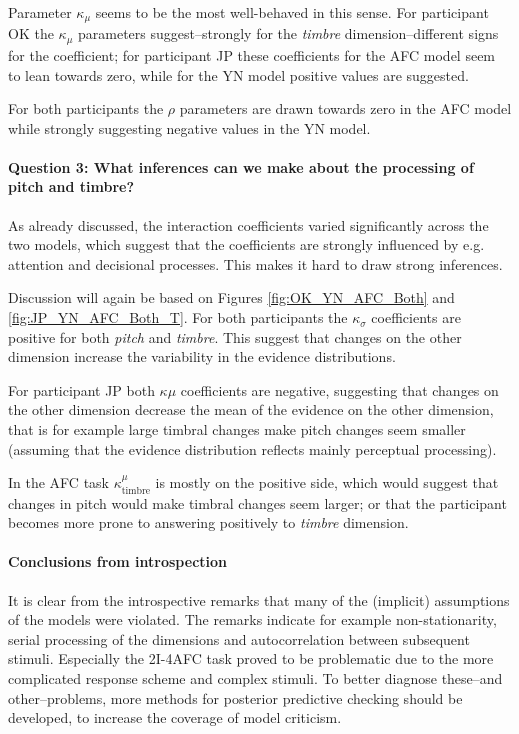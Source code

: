 \documentclass{article}\usepackage{knitr}
\begin{document}
Parameter $\kappa_{\mu}$ seems to be the most well-behaved  in this sense. For participant OK the $\kappa_{\mu}$ parameters suggest--strongly for the \textit{timbre} dimension--different signs for the coefficient; for participant JP these coefficients for the AFC model seem to lean towards zero, while for the YN model positive values are suggested. 

For both participants the $\rho$ parameters are drawn towards zero in the AFC model while strongly suggesting negative values in the YN model. 

\paragraph{Question 3: What inferences can we make about the processing of pitch and timbre?}

As already discussed, the interaction coefficients varied significantly across the two models, which suggest that the coefficients are strongly influenced by e.g. attention and decisional processes. This makes it hard to draw strong inferences.

Discussion will again be based on Figures \ref{fig:OK_YN_AFC_Both} and \ref{fig:JP_YN_AFC_Both_T}. For both participants the $\kappa_{\sigma}$ coefficients are positive for both \textit{pitch} and \textit{timbre}. This suggest that  changes on the other dimension increase the variability in the evidence distributions. 

For participant JP both $\kappa{\mu}$ coefficients are negative, suggesting that changes on the other dimension decrease the mean of the evidence on the other dimension, that is for example large timbral changes make pitch changes seem smaller (assuming that the evidence distribution reflects mainly perceptual processing).

In the AFC task $\kappa^{\mu}_\text{timbre}$ is mostly on the positive side, which would suggest that changes in pitch would make timbral changes seem larger; or that the participant becomes more prone to answering positively to \textit{timbre} dimension. 

\paragraph{Conclusions from introspection}

It is clear from the introspective remarks that many of the (implicit) assumptions of the models were violated. The remarks indicate for example non-stationarity, serial processing of the dimensions and autocorrelation between subsequent stimuli. Especially the 2I-4AFC task proved to be problematic due to the more complicated response scheme and complex stimuli.  To better diagnose these--and other--problems, more methods for posterior predictive checking should be developed, to increase the coverage of model criticism. 
\end{document}
